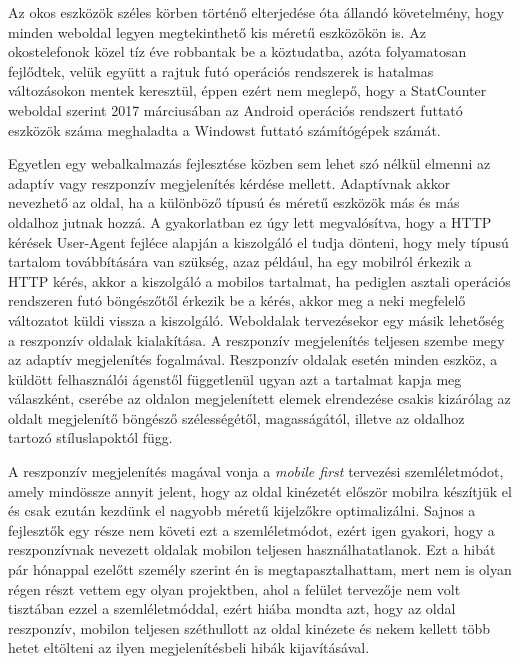 \documentclass[hidelinks, 12pt, a4paper]{report}
\begin{document}
Az okos eszközök széles körben történő elterjedése óta állandó követelmény, hogy minden weboldal legyen megtekinthető kis méretű eszközökön is. Az okostelefonok közel tíz éve robbantak be a köztudatba, azóta folyamatosan fejlődtek, velük együtt a rajtuk futó operációs rendszerek is hatalmas változásokon mentek keresztül, éppen ezért nem meglepő, hogy a StatCounter \cite{statcounter} weboldal szerint 2017 márciusában az Android operációs rendszert futtató eszközök száma meghaladta a Windowst futtató számítógépek számát.

Egyetlen egy webalkalmazás fejlesztése közben sem lehet szó nélkül elmenni az adaptív vagy reszponzív megjelenítés kérdése mellett. Adaptívnak akkor nevezhető az oldal, ha a különböző típusú és méretű eszközök más és más oldalhoz jutnak hozzá. A gyakorlatban ez úgy lett megvalósítva, hogy a HTTP kérések User-Agent fejléce alapján a kiszolgáló el tudja dönteni, hogy mely típusú tartalom továbbítására van szükség, azaz például, ha egy mobilról érkezik a HTTP kérés, akkor a kiszolgáló a mobilos tartalmat, ha pediglen asztali operációs rendszeren futó böngészőtől érkezik be a kérés, akkor meg a neki megfelelő változatot küldi vissza a kiszolgáló. Weboldalak tervezésekor egy másik lehetőség a reszponzív oldalak kialakítása. A reszponzív megjelenítés teljesen szembe megy az adaptív megjelenítés fogalmával. Reszponzív oldalak esetén minden eszköz, a küldött felhasználói ágenstől függetlenül ugyan azt a tartalmat kapja meg válaszként, cserébe az oldalon megjelenített elemek elrendezése csakis kizárólag az oldalt megjelenítő böngésző szélességétől, magasságától, illetve az oldalhoz tartozó stíluslapoktól függ.

A reszponzív megjelenítés magával vonja a \emph{mobile first} tervezési szemléletmódot, amely mindössze annyit jelent, hogy az oldal kinézetét először mobilra készítjük el és csak ezután kezdünk el nagyobb méretű kijelzőkre optimalizálni. Sajnos a fejlesztők egy része nem követi ezt a szemléletmódot, ezért igen gyakori, hogy a reszponzívnak nevezett oldalak mobilon teljesen használhatatlanok. Ezt a hibát pár hónappal ezelőtt személy szerint én is megtapasztalhattam, mert nem is olyan régen részt vettem egy olyan projektben, ahol a felület tervezője nem volt tisztában ezzel a szemléletmóddal, ezért hiába mondta azt, hogy az oldal reszponzív, mobilon teljesen széthullott az oldal kinézete és nekem kellett több hetet eltölteni az ilyen megjelenítésbeli hibák kijavításával.

\end{document}
